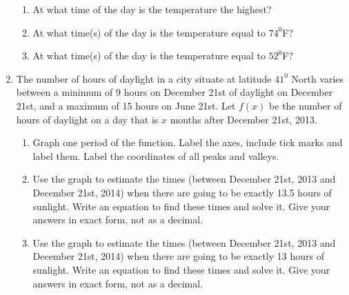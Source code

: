 \documentclass[11pt]{article}
\begin{document}
\begin{enumerate}
\begin{enumerate}
\item At what time of the day is the temperature the highest? 

\item At what time(s) of the day is the temperature equal to $74^0$F?

\item At what time(s) of the day is the temperature equal to $52^0$F?

\end{enumerate}

\item The number of hours of daylight in a city situate at  latitude $41^0$ North varies between a minimum of 9 hours on December 21st of daylight on December 21st, and a maximum of 15 hours on June 21st. %
Let $f(x)$ be the number of hours
of daylight  on a day that is $x$ months after December 21st, 2013. 
\begin{enumerate} 
\item Graph one period of the function. Label the axes, include tick marks and label them. Label the coordinates of all peaks and valleys.
\item Use the graph to estimate the times (between December 21st, 2013 and December 21st, 2014) when there are going to be exactly 13.5 hours of sunlight. Write an equation to find these times and solve it. Give your answers in exact form, not as a decimal.
\item Use the graph to estimate the times (between December 21st, 2013 and December 21st, 2014) when there are going to be exactly 13 hours of sunlight. Write an equation to find these times and solve it. Give your answers in exact form, not as a decimal.
\end{enumerate}



\end{enumerate}
\end{document}
